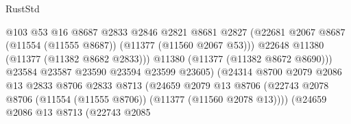 \begin{lexlean}{RustStd}
\begin{coremodule}
                                              @103
                                              @53
                                              @16
                                              @8687
                                              @2833
                                              @2846
                                              @2821
                                              @8681
                                              @2827
                                              (@22681
                                                @2067
                                                @8687
                                                (@11554 (@11555 @8687))
                                                (@11377 (@11560 @2067 @53)))
                                              @22648
                                              @11380
                                              (@11377 (@11382 @8682 @2833)))
                                            @11380
                                            (@11377 (@11382 @8672 @8690)))
                                          @23584
                                          @23587
                                          @23590
                                          @23594
                                          @23599
                                          @23605)
                                        (@24314
                                          @8700
                                          @2079
                                          @2086
                                          @13
                                          @2833
                                          @8706
                                          @2833
                                          @8713
                                          (@24659
                                            @2079
                                            @13
                                            @8706
                                            (@22743
                                              @2078
                                              @8706
                                              (@11554 (@11555 @8706))
                                              (@11377 (@11560 @2078 @13))))
                                          (@24659
                                            @2086
                                            @13
                                            @8713
                                            (@22743
                                              @2085

\end{coremodule}
\end{lexlean}
